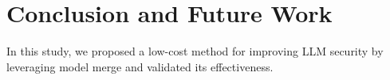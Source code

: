 \documentclass[conference,compsoc]{IEEEtran}
\begin{document}





\section{Conclusion and Future Work}
In this study, we proposed a low-cost method for improving LLM security by leveraging model merge and validated its effectiveness.
\end{document}

